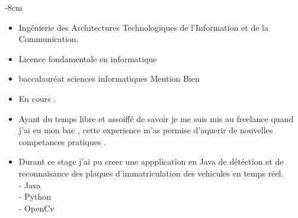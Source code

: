 \documentclass[10pt,a4paper]{altacv}
\begin{document}
\begin{adjustwidth}{}{-8cm}
\makecvheader
\end{adjustwidth}
\marginpar{\vspace*{\dimexpr1pt-\baselineskip}\raggedright}
 {}
\begin{itemize}
	\item Ingénierie des Architectures Technologiques de l'Information et de la Communication. 
\end{itemize}
 {}
\begin{itemize}
	\item Licence fondamentale en informatique 
\end{itemize}
 {}
\begin{itemize}
	\item baccalauréat sciences informatiques Mention Bien 
\end{itemize}
 {}
\begin{itemize}
	\item En cours . 
\end{itemize}
 {}
\begin{itemize}
	\item Ayant du temps libre et assoiffé de savoir je me suis mis au freelance quand j'ai eu mon bac , cette experience m'as permise d'aquerir de nouvelles competances pratiques . 
\end{itemize}
 {}
\begin{itemize}
	\item Durant ce stage j'ai pu creer une appplication en Java de détéction et de reconnaisance des plaques d'immatriculation des vehicules en temps réel.\\- Java\\- Python\\- OpenCv 
\end{itemize}
\end{document}
